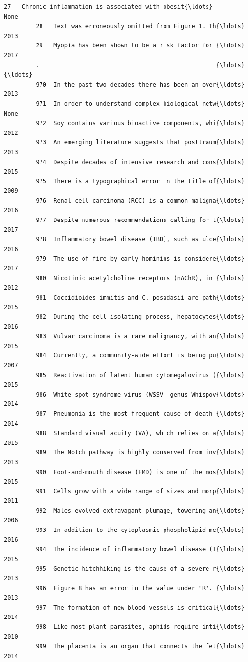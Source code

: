 \documentclass[11pt]{article}
\begin{document}
\begin{Verbatim}[commandchars=\\\{\}]
         27   Chronic inflammation is associated with obesit{\ldots}           None   
         28   Text was erroneously omitted from Figure 1. Th{\ldots}           2013   
         29   Myopia has been shown to be a risk factor for {\ldots}           2017   
         ..                                                 {\ldots}            {\ldots}   
         970  In the past two decades there has been an over{\ldots}           2013   
         971  In order to understand complex biological netw{\ldots}           None   
         972  Soy contains various bioactive components, whi{\ldots}           2012   
         973  An emerging literature suggests that posttraum{\ldots}           2013   
         974  Despite decades of intensive research and cons{\ldots}           2015   
         975  There is a typographical error in the title of{\ldots}           2009   
         976  Renal cell carcinoma (RCC) is a common maligna{\ldots}           2016   
         977  Despite numerous recommendations calling for t{\ldots}           2017   
         978  Inflammatory bowel disease (IBD), such as ulce{\ldots}           2016   
         979  The use of fire by early hominins is considere{\ldots}           2017   
         980  Nicotinic acetylcholine receptors (nAChR), in {\ldots}           2012   
         981  Coccidioides immitis and C. posadasii are path{\ldots}           2015   
         982  During the cell isolating process, hepatocytes{\ldots}           2016   
         983  Vulvar carcinoma is a rare malignancy, with an{\ldots}           2015   
         984  Currently, a community-wide effort is being pu{\ldots}           2007   
         985  Reactivation of latent human cytomegalovirus ({\ldots}           2015   
         986  White spot syndrome virus (WSSV; genus Whispov{\ldots}           2014   
         987  Pneumonia is the most frequent cause of death {\ldots}           2014   
         988  Standard visual acuity (VA), which relies on a{\ldots}           2015   
         989  The Notch pathway is highly conserved from inv{\ldots}           2013   
         990  Foot-and-mouth disease (FMD) is one of the mos{\ldots}           2015   
         991  Cells grow with a wide range of sizes and morp{\ldots}           2011   
         992  Males evolved extravagant plumage, towering an{\ldots}           2006   
         993  In addition to the cytoplasmic phospholipid me{\ldots}           2016   
         994  The incidence of inflammatory bowel disease (I{\ldots}           2015   
         995  Genetic hitchhiking is the cause of a severe r{\ldots}           2013   
         996  Figure 8 has an error in the value under "R". {\ldots}           2013   
         997  The formation of new blood vessels is critical{\ldots}           2014   
         998  Like most plant parasites, aphids require inti{\ldots}           2010   
         999  The placenta is an organ that connects the fet{\ldots}           2014   
         

\end{Verbatim}
\end{document}
